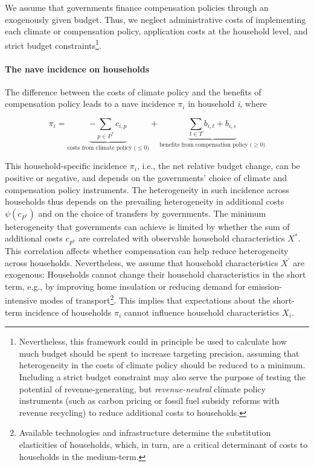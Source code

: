 \documentclass[12pt, a4paper]{article}
\begin{document}
We assume that governments finance compensation policies through an exogenously given budget. Thus, we neglect administrative costs of implementing each climate or compensation policy, application costs at the household level, and strict budget constraints\footnote{Nevertheless, this framework could in principle be used to calculate how much budget should be spent to increase targeting precision, assuming that heterogeneity in the costs of climate policy should be reduced to a minimum. Including a strict budget constraint may also serve the purpose of testing the potential of revenue-generating, but \textit{revenue-neutral} climate policy instruments (such as carbon pricing or fossil fuel subsidy reforms with revenue recycling) to reduce additional costs to households.}. 

\paragraph{The nave incidence on households}
The difference between the costs of climate policy and the benefits of compensation policy leads to a nave incidence $\pi_{i}$ in household \textit{i}, where

\begin{equation} \label{eq:pi}
    \pi_{i} = \underbrace{-\sum_{p\in P^{\ast}} c_{i,p}}_{\text{costs from climate policy ($\leq 0$)}} + \underbrace{\sum_{t\in T} b_{i,t} + b_{i,\varepsilon}}_{\text{benefits from compensation policy ($\geq 0$)}}
\end{equation}

This household-specific incidence $\pi_{i}$, i.e., the net relative budget change, can be positive or negative, and depends on the governments' choice of climate and compensation policy instruments. The heterogeneity in such incidence across households thus depends on the prevailing heterogeneity in additional costs $\psi(c_{P^{\ast}})$ and on the choice of transfers by governments. The minimum heterogeneity that governments can achieve is limited by whether the sum of additional costs $c_{P^{\ast}}$ are correlated with observable household characteristics $X^{\ast}$. This correlation affects whether compensation can help reduce heterogeneity across households. Nevertheless, we assume that household characteristics $X^{\prime}$ are exogenous: Households cannot change their household characteristics in the short term, e.g., by improving home insulation or reducing demand for emission-intensive modes of transport\footnote{Available technologies and infrastructure determine the substitution elasticities of households, which, in turn, are a critical determinant of costs to households in the medium-term.}. This implies that expectations about the short-term incidence of households $\pi_{i}$ cannot influence household characteristics $X_{i}$.
\end{document}
